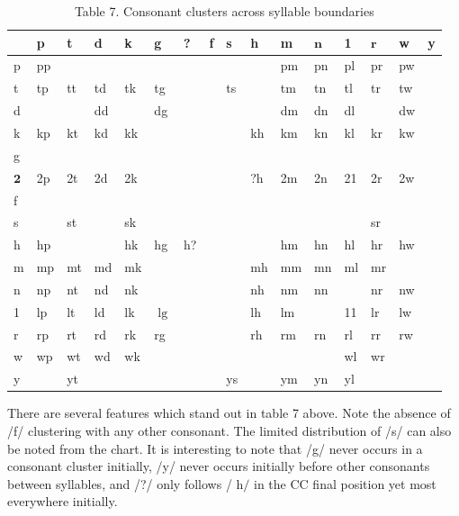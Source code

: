 \documentclass[10pt]{article}
\begin{document}
\begin{table}[h]
\begin{center}
\captionsetup{labelformat=empty}
\caption{Table 7. Consonant clusters across syllable boundaries}
\begin{tabular}{|l|l|l|l|l|l|l|l|l|l|l|l|l|l|l|l|}
\hline
 & p & t & d & k & g & ? & f & s & h & m & \(\mathbf{n}\) & 1 & \(\mathbf{r}\) & w & y \\
\hline
p & pp &  &  &  &  &  &  &  &  & pm & pn & pl & pr & pw &  \\
\hline
t & tp & tt & td & tk & tg &  &  & ts &  & tm & tn & tl & tr & tw &  \\
\hline
d &  &  & dd &  & dg &  &  &  &  & dm & dn & dl &  & dw &  \\
\hline
k & kp & kt & kd & kk &  &  &  &  & kh & km & kn & kl & kr & kw &  \\
\hline
g &  &  &  &  &  &  &  &  &  &  &  &  &  &  &  \\
\hline
\(\mathbf{2}\) & 2p & 2t & 2d & 2k &  &  &  &  & ?h & 2m & 2n & 21 & 2r & 2w &  \\
\hline
f &  &  &  &  &  &  &  &  &  &  &  &  &  &  &  \\
\hline
s &  & st &  & sk & \multirow{3}{*}{hg} &  &  &  &  &  &  &  & sr &  &  \\
\hline
h & hp &  &  & hk &  & h? &  &  &  & hm & hn & hl & hr & hw &  \\
\hline
m & mp & mt & md & mk &  &  &  &  & mh & mm & mn & ml & mr &  &  \\
\hline
n & np & nt & nd & nk &  &  &  &  & nh & nm & nn &  & nr & nw &  \\
\hline
1 & lp & lt & ld & lk & \(\lg\) &  &  &  & lh & lm &  & 11 & lr & lw &  \\
\hline
r & rp & rt & rd & rk & rg &  &  &  & rh & rm & rn & rl & rr & rw &  \\
\hline
w & wp & wt & wd & wk &  &  &  &  &  &  &  & wl & wr &  &  \\
\hline
y &  & yt &  &  &  &  &  & ys &  & ym & yn & yl &  &  &  \\
\hline
\end{tabular}
\end{center}
\end{table}

There are several features which stand out in table 7 above. Note the absence of /f/ clustering with any other consonant. The limited distribution of /s/ can also be noted from the chart. It is interesting to note that /g/ never occurs in a consonant cluster initially, /y/ never occurs initially before other consonants between syllables, and /?/ only follows / \(\mathrm{h} /\) in the CC final position yet most everywhere initially.
\end{document}
